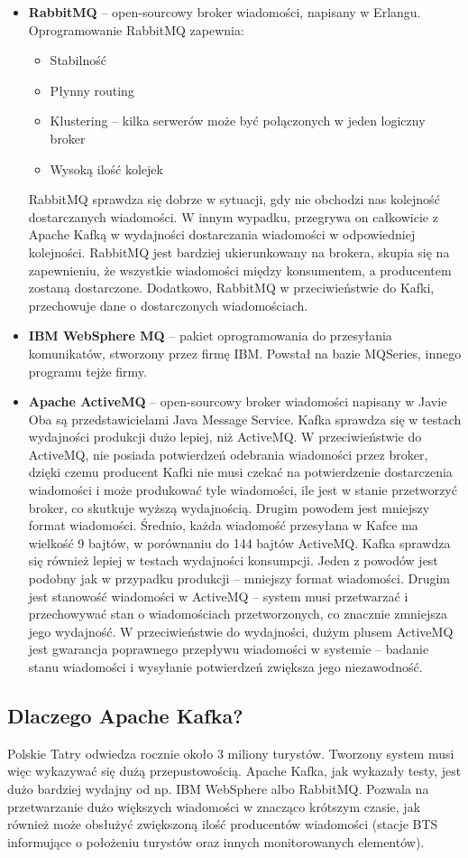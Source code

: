 \documentclass[a4paper,12pt]{article}
\begin{document}
\begin{itemize}
\item \textbf{RabbitMQ} – open-sourcowy broker wiadomości, napisany w Erlangu. Oprogramowanie RabbitMQ zapewnia:
\begin{itemize}
\item Stabilność
\item Płynny routing
\item Klustering – kilka serwerów może być połączonych w jeden logiczny broker
\item Wysoką ilość kolejek
\end{itemize}
RabbitMQ sprawdza się dobrze w sytuacji, gdy nie obchodzi nas kolejność dostarczanych wiadomości. W innym wypadku, przegrywa on całkowicie z Apache Kafką w wydajności dostarczania wiadomości w odpowiedniej kolejności. RabbitMQ jest bardziej ukierunkowany na brokera, skupia się na zapewnieniu, że wszystkie wiadomości między konsumentem, a producentem zostaną dostarczone. Dodatkowo, RabbitMQ w przeciwieństwie do Kafki, przechowuje dane o dostarczonych wiadomościach.
\item \textbf{IBM WebSphere MQ} – pakiet oprogramowania do przesyłania komunikatów, stworzony przez firmę IBM. Powstał na bazie MQSeries, innego programu tejże firmy. 
\item \textbf{Apache ActiveMQ} – open-sourcowy broker wiadomości napisany w Javie
Oba są przedstawicielami Java Message Service.
Kafka sprawdza się w testach wydajności produkcji dużo lepiej, niż ActiveMQ. W przeciwieństwie do ActiveMQ, nie posiada potwierdzeń odebrania wiadomości przez broker, dzięki czemu producent Kafki nie musi czekać na potwierdzenie dostarczenia wiadomości i  może produkować tyle wiadomości, ile jest w stanie przetworzyć broker, co skutkuje wyższą wydajnością. Drugim powodem jest mniejszy format wiadomości. Średnio, każda wiadomość przesyłana w Kafce ma wielkość 9 bajtów, w porównaniu do 144 bajtów ActiveMQ.
Kafka sprawdza się również lepiej w testach wydajności konsumpcji. Jeden z powodów jest podobny jak w przypadku produkcji – mniejszy format wiadomości. Drugim jest stanowość wiadomości w ActiveMQ – system musi przetwarzać i przechowywać stan o wiadomościach przetworzonych, co znacznie zmniejsza jego wydajność.
W przeciwieństwie do wydajności, dużym plusem ActiveMQ jest gwarancja poprawnego przepływu wiadomości w systemie – badanie stanu wiadomości i wysyłanie potwierdzeń zwiększa jego niezawodność.

\end{itemize}
\subsection{Dlaczego Apache Kafka?}
Polskie Tatry odwiedza rocznie około 3 miliony turystów. Tworzony system musi więc wykazywać się dużą przepustowością. Apache Kafka, jak wykazały testy, jest dużo bardziej wydajny od np. IBM WebSphere albo RabbitMQ. Pozwala na przetwarzanie dużo większych wiadomości w znacząco krótszym czasie, jak również może obsłużyć zwiększoną ilość producentów wiadomości (stacje BTS informujące o położeniu turystów oraz innych monitorowanych elementów). 
\end{document}
